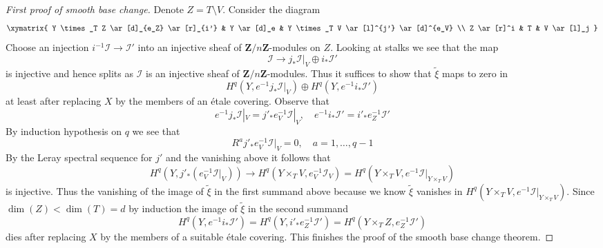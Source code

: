 \begin{proof}[First proof of smooth base change]
\medskip\noindent
Denote $Z = T \setminus V$. Consider the diagram
$$
\xymatrix{
Y \times_T Z \ar[d]_{e_Z} \ar[r]_{i'} &
Y \ar[d]_e &
Y \times_T V \ar[l]^{j'} \ar[d]^{e_V} \\
Z \ar[r]^i &
T &
V \ar[l]_j
}
$$
Choose an injection $i^{-1}\mathcal{I} \to \mathcal{I}'$
into an injective sheaf of $\mathbf{Z}/n\mathbf{Z}$-modules on $Z$.
Looking at stalks we see that the map
$$
\mathcal{I} \to j_*\mathcal{I}|_V \oplus i_*\mathcal{I}'
$$
is injective and hence splits as $\mathcal{I}$ is an injective sheaf
of $\mathbf{Z}/n\mathbf{Z}$-modules. Thus it suffices to show that
$\tilde \xi$ maps to zero in
$$
H^q(Y, e^{-1}j_*\mathcal{I}|_V) \oplus
H^q(Y, e^{-1}i_*\mathcal{I}')
$$
at least after replacing $X$ by the members of an \'etale covering.
Observe that
$$
e^{-1}j_*\mathcal{I}|_V = j'_*e_V^{-1}\mathcal{I}|_V,\quad
e^{-1}i_*\mathcal{I}' = i'_*e_Z^{-1}\mathcal{I}'
$$
By induction hypothesis on $q$ we see that
$$
R^aj'_*e_V^{-1}\mathcal{I}|_V = 0, \quad a = 1, \ldots, q - 1
$$
By the Leray spectral sequence for $j'$ and the vanishing
above it follows that
$$
H^q(Y, j'_*(e_V^{-1}\mathcal{I}|_V))
\longrightarrow
H^q(Y \times_T V, e_V^{-1}\mathcal{I}_V) =
H^q(Y \times_T V, e^{-1}\mathcal{I}|_{Y \times_T V})
$$
is injective. Thus the vanishing of the image of $\tilde \xi$
in the first summand above because we know $\tilde \xi$ vanishes
in $H^q(Y \times_T V, e^{-1}\mathcal{I}|_{Y \times_T V})$.
Since $\dim(Z) < \dim(T) = d$ by induction the image of $\tilde \xi$
in the second summand
$$
H^q(Y, e^{-1}i_*\mathcal{I}') =
H^q(Y, i'_*e_Z^{-1}\mathcal{I}') =
H^q(Y \times_T Z, e_Z^{-1}\mathcal{I}')
$$
dies after replacing $X$ by the members of a suitable \'etale covering.
This finishes the proof of the smooth base change theorem.
\end{proof}

